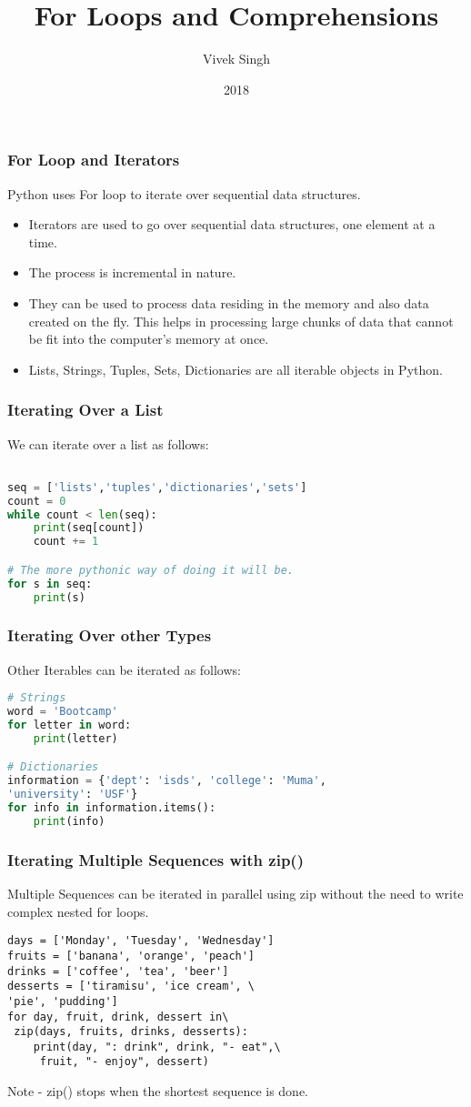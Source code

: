 \documentclass{beamer}
\title{For Loops and Comprehensions}
\author{Vivek Singh}
\institute{Information Systems Decision Sciences (ISDS)\\
MUMA College of Business\\
University of South Florida \\
Tampa, Florida}
\date{2018}
\begin{document}
\frame{\titlepage}

\begin{frame}
\frametitle{For Loop and Iterators}
Python uses For loop to iterate over sequential data structures.
\begin{itemize}
\item Iterators are used to go over sequential data structures, one element at a time.
\item The process is incremental in nature.
\item They can be used to process data residing in the memory and also data created on the fly. This helps in processing large chunks of data that cannot be fit into the computer's memory at once.
\item Lists, Strings, Tuples, Sets, Dictionaries are all iterable objects in Python.
\end{itemize}
\end{frame}

\begin{frame}[fragile]
\frametitle{Iterating Over a List}
We can iterate over a list as follows:
\begin{lstlisting}[language=Python]

seq = ['lists','tuples','dictionaries','sets']
count = 0
while count < len(seq):
    print(seq[count])
    count += 1  

# The more pythonic way of doing it will be.
for s in seq:
    print(s)
\end{lstlisting}
\end{frame}

\begin{frame}[fragile]
\frametitle{Iterating Over other Types}
Other Iterables can be iterated as follows:
\begin{lstlisting}[language=Python]
# Strings
word = 'Bootcamp'
for letter in word:
	print(letter)

# Dictionaries
information = {'dept': 'isds', 'college': 'Muma',
'university': 'USF'}
for info in information.items():
    print(info)
\end{lstlisting}
\end{frame}

\begin{frame}[fragile]
\frametitle{Iterating Multiple Sequences with zip()}
Multiple Sequences can be iterated in parallel using zip without the need to write complex nested for loops.
\begin{lstlisting}
days = ['Monday', 'Tuesday', 'Wednesday']
fruits = ['banana', 'orange', 'peach']
drinks = ['coffee', 'tea', 'beer']
desserts = ['tiramisu', 'ice cream', \
'pie', 'pudding']
for day, fruit, drink, dessert in\
 zip(days, fruits, drinks, desserts):
    print(day, ": drink", drink, "- eat",\
     fruit, "- enjoy", dessert)
\end{lstlisting}

Note - zip() stops when the shortest sequence is done.
\end{frame}
\end{document}
